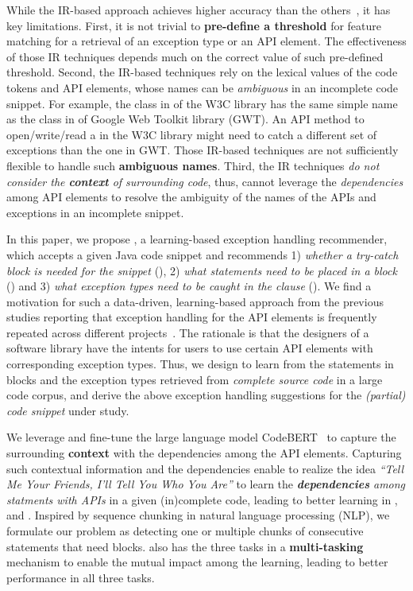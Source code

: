While the IR-based approach achieves higher accuracy than the
others~\cite{xrank-fse20}, it has key limitations. First, it is not
trivial to {\bf pre-define a threshold} for feature matching for a
retrieval of an exception type or an API element. The effectiveness of
those IR techniques depends much on the correct value of such
pre-defined threshold. Second, the IR-based techniques rely on the
lexical values of the code tokens and API elements, whose names can be
{\em ambiguous} in an incomplete code snippet. For example, the
 class in  of the W3C library has
the same simple name as the  class in
 of Google Web
Toolkit library (GWT). An API method to open/write/read a
 in the W3C library might need to catch a different set
of exceptions than the one in GWT. Those IR-based techniques are not
sufficiently flexible to handle such {\bf ambiguous names}. Third, the
IR techniques {\em do not consider the {\bf context} of surrounding
  code}, thus, cannot leverage the {\em dependencies} among API
elements to resolve the ambiguity of the names of the APIs and
  exceptions in an incomplete snippet.

In this paper, we propose {\tool}, a learning-based exception handling
recommender, which accepts a given Java code snippet and recommends 1)
{\em whether a try-catch block is needed for the snippet} ({\xblock}),
2) {\em what statements need to be placed in a  block}
({\xstate}) and 3) {\em what exception types need to be caught in the
   clause} ({\xtype}).  We find a motivation for such a
data-driven, learning-based approach from the previous studies
reporting that exception handling for the API elements is frequently
repeated across different
projects~\cite{chanchal-scam14,zhong-jss18}. The rationale is that the
designers of a software library have the intents for users to use
certain API elements with corresponding exception types.  Thus, we
design {\tool} to learn from the statements in  blocks
and the exception types retrieved from {\em complete source code} in a large
code corpus, and derive the above exception handling suggestions for
the {\em (partial) code snippet} under study.

We leverage and fine-tune the large language model
CodeBERT~\cite{codebert-emnlp20} to capture the surrounding {\bf context}
with the dependencies among the API elements. Capturing such
contextual information and the dependencies enable {\tool} to realize
the idea {\em ``Tell Me Your Friends, I'll Tell You Who You Are''} to
learn the {\em {\bf dependencies} among statments with APIs} in a given
(in)complete code, leading to better learning in {\xblock}, {\xstate}
and {\xtype}. Inspired by sequence chunking in natural language
processing (NLP), we formulate our problem as detecting one or
multiple chunks of consecutive statements that need 
blocks.
{\tool} also has the three tasks in a {\bf multi-tasking} mechanism
to enable the mutual impact among the learning, leading to
better performance in all three tasks.

